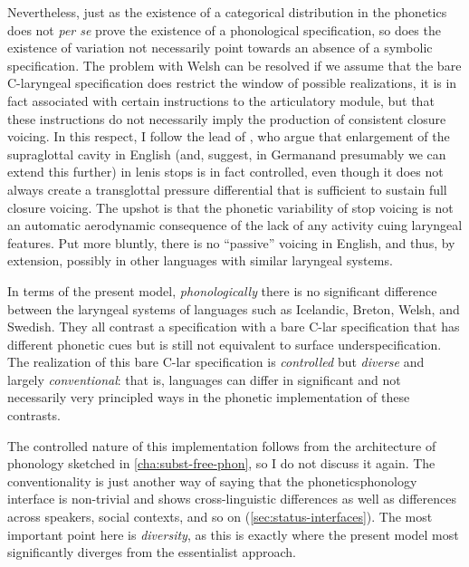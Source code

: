 Nevertheless, just as the existence of a categorical distribution in the phonetics does not \emph{per se} prove the existence of a phonological specification, so does the existence of variation not necessarily point towards an absence of a symbolic specification. The problem with Welsh can be resolved if we assume that the bare C-laryngeal specification does restrict the window of possible realizations, \ie it is in fact associated with certain instructions to the articulatory module, but that these instructions do not necessarily imply the production of consistent closure voicing. In this respect, I follow the lead of \citet{kingston09:_voice}, who argue \citep[following][]{westbury83:_enlar,westbury86:_natur_stop_conson_voicin} that enlargement of the supraglottal cavity in English (and, \citeauthor{kingston09:_voice} suggest, in German\dash and presumably we can extend this further) in lenis stops is in fact controlled, even though it does not always create a transglottal pressure differential that is sufficient to sustain full closure voicing. The upshot is that the phonetic variability of stop voicing is not an automatic aerodynamic consequence of the lack of any activity cuing laryngeal features. Put more bluntly, there is no \enquote{passive} voicing in English, and thus, by extension, possibly in other languages with similar laryngeal systems.

In terms of the present model, \emph{phonologically} there is no significant difference between the laryngeal systems of languages such as Icelandic, Breton, Welsh, and Swedish. They all contrast a  specification with a bare C-lar specification that has different phonetic cues but is still not equivalent to surface underspecification. The realization of this bare C-lar specification is \emph{controlled} but \emph{diverse} and largely \emph{conventional}: that is, languages can differ in significant and not necessarily very principled ways in the phonetic implementation of these contrasts.

The controlled nature of this implementation follows from the architecture of phonology sketched in \cref{cha:subst-free-phon}, so I do not discuss it again. The conventionality is just another way of saying that the phonetics\endash phonology interface is non\hyp trivial and shows cross\hyp linguistic differences as well as differences across speakers, social contexts, and so on (\cref{sec:status-interfaces}). The most important point here is \emph{diversity}, as this is exactly where the present model most significantly diverges from the essentialist approach.

